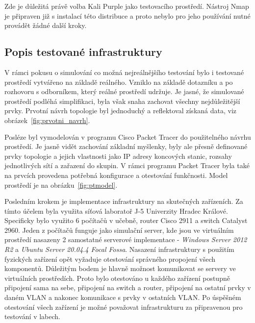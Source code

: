 Zde je důležitá právě volba Kali Purple jako testovacího prostředí.
Nástroj Nmap je připraven již s instalací této distribuce a proto nebylo pro jeho používání nutné provádět žádné další kroky.


\subsection{Popis testované infrastruktury}\label{subsec:popis-testovane-infrastruktury}
V rámci pokusu o simulování co možná nejreálnějšího testování bylo i testované prostředí vytvářeno na základě reálného.
Vzniklo na základě dotazníku a po rozhovoru s odborníkem, který reálné prostředí udržuje.
Je jasné, že simulované prostředí podléhá simplifikaci, byla však snaha zachovat všechny nejdůležitější prvky.
Prvotní návrh topologie byl jednoduchý a reflektoval získaná data, viz obrázek~\ref{fig:prvotni_navrh}.


Posléze byl vymodelován v programu Cisco Packet Tracer do použitelného návrhu prostředí.
Je jasně vidět zachování základní myšlenky, byly ale přesně definované prvky topologie a jejich vlastnosti jako IP adresy koncových stanic, rozsahy jednotlivých sítí a zařazení do  skupin.
V rámci programu Packet Tracer byla také na prvcích provedena potřebná konfigurace a otestování funkčnosti.
Model prostředí je na obrázku~\ref{fig:ptmodel}.



Posledním krokem je implementace infrastruktury na skutečných zařízeních.
Za tímto účelem byla využita síťová laboratoř J-5 Univerzity Hradec Králové.
Specificky bylo využito 6 počítačů v učebně, router Cisco 2911 a switch Catalyst 2960.
Jeden z počítačů funguje jako simulační server, kde jsou ve virtuálním prostředí nasazeny 2 samostatné serverové implementace - \textit{Windows Server 2012 R2} a \textit{Ubuntu Server 20.04.4 Focal Fossa}.
Nasazení infrastruktury s použitím fyzických zařízení opět vyžaduje otestování správného propojení všech komponentů.
Důležitým bodem je hlavně možnost komunikovat se servery ve virtuálních prostředích.
Proto bylo otestováno u každého zařízení postupně připojení sama na sebe, připojení na switch a router, připojení na ostatní prvky v daném \ac{VLAN} a nakonec komunikace s prvky v ostatních \ac{VLAN}.
Po úspěšném otestování všech zařízení je možné považovat infrastrukturu za připravenou pro testování v labech.

